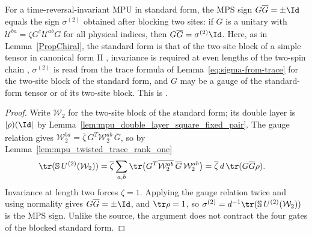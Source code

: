 \begin{lemma}
    \label{prop:dagger-mps-class-and-mpu-class-equal}
    \leanok
    For a time-reversal-invariant MPU in standard form, the MPS sign
    $G\overline G=\pm\Id$ equals the sign $\sigma^{(2)}$ obtained after
    blocking two sites: if $G$ is a unitary with
    $\overline{\mathcal U^{ba}}=\zeta G^\dagger\mathcal U^{ab}G$ for all
    physical indices, then $G\overline G=\sigma^{(2)}\Id$. Here, as in
    Lemma~\ref{PropChiral}, the standard form is that of the two-site block of
    a simple tensor in canonical form II
    \cite{gap:mpu_standard_form_canonical_convention}, invariance is required
    at even lengths of the two-spin chain
    \cite{gap:mpu_standard_form_parity_gap}, $\sigma^{(2)}$ is read from the
    trace formula of Lemma~\ref{eq:sigma-from-trace} for the two-site block of
    the standard form, and $G$ may be a gauge of the standard-form tensor or of
    its two-site block. This is \cite[Proposition~VI.13]{Cirac2017MPU}.
\end{lemma}

\begin{proof}
    \leanok
    Write $\mathcal W_2$ for the two-site block of the standard form; its
    double layer is $|\rho)(\Id|$ by
    Lemma~\ref{lem:mpu_double_layer_square_fixed_pair}. The gauge relation
    gives $\mathcal W_2^{ba}=\overline\zeta\,G^T\overline{\mathcal W_2^{ab}}\,\overline G$,
    so by Lemma~\ref{lem:mpu_twisted_trace_rank_one}
    \begin{align}
        \tr(\mathbb S\,U^{(2)}(\mathcal W_2))
         & =\overline\zeta\sum_{a,b}\tr\bigl(G^T\overline{\mathcal W_2^{ab}}\,\overline G\,\mathcal W_2^{ab}\bigr)
        =\overline\zeta\,d\,\tr(G\overline G\rho).
    \end{align}
    Invariance at length two forces $\zeta=1$. Applying the gauge relation
    twice and using normality gives $G\overline G=\pm\Id$, and $\tr\rho=1$, so
    $\sigma^{(2)}=d^{-1}\tr(\mathbb S\,U^{(2)}(\mathcal W_2))$ is the MPS sign.
    Unlike the source, the argument does not contract the four gates of the
    blocked standard form.
\end{proof}
